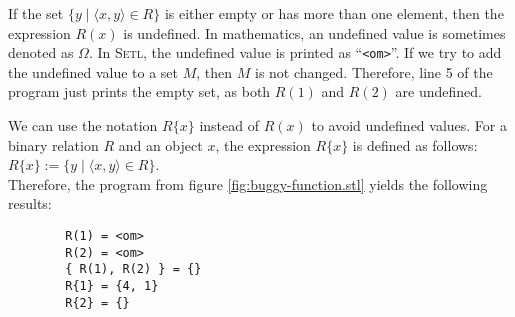 If the set $\{ y \mid \langle x, y \rangle \in R \}$ is either empty or has more than one
element, then the expression $R(x)$ is undefined.  In mathematics, an undefined value is
sometimes denoted as $\Omega$.  In \textsc{Setl},
the undefined value is printed as ``\texttt{<om>}''.
If we try to add the undefined value to a set $M$, then $M$ is not changed.
Therefore, line 5 of the program just prints the empty set, as both $R(1)$ and $R(2)$
are undefined.

We can use the notation  $R\{x\}$ instead of $R(x)$ to avoid undefined values.
For a binary relation $R$ and an object $x$, the expression $R\{x\}$ is defined as
follows: 
\\[0.2cm]
\hspace*{1.3cm} 
$R\{x\} := \{ y \mid \langle x, y \rangle \in R \}$.
\\[0.2cm]
Therefore, the  program from figure \ref{fig:buggy-function.stl} yields the following results:
\begin{verbatim}
        R(1) = <om>
        R(2) = <om>
        { R(1), R(2) } = {}
        R{1} = {4, 1}
        R{2} = {}
\end{verbatim}

